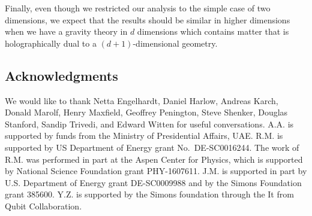 \documentclass[12pt]{article}
\begin{document}
Finally, even though we restricted our analysis to the simple case of two dimensions, we expect that the results should be similar in higher dimensions when we have a gravity theory in $d$ dimensions which contains matter that is holographically dual to a $(d+1)$-dimensional geometry. 


\subsection*{Acknowledgments}

We would like to thank Netta Engelhardt, Daniel Harlow, Andreas Karch, Donald Marolf, Henry Maxfield, Geoffrey Penington, Steve Shenker, Douglas Stanford, Sandip Trivedi, and Edward Witten for useful conversations. 
A.A. is supported by funds from the Ministry of Presidential Affairs, UAE.
R.M. is supported by US Department of Energy grant No.\ DE-SC0016244.
The work of R.M. was performed in part at the Aspen Center for Physics, which is supported by National Science Foundation grant PHY-1607611.
J.M. is supported in part by U.S. Department of Energy grant DE-SC0009988 and by the Simons Foundation grant 385600.
Y.Z. is supported by the Simons foundation through the It from Qubit Collaboration.




\end{document}
